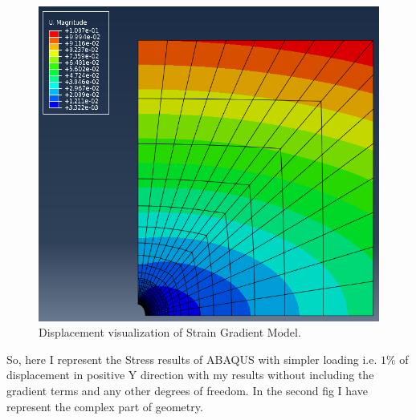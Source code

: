 \documentclass[12pt]{article}
\begin{document}
\begin{figure}[H]
	\begin{center}
		\includegraphics[scale=0.4]{MY_code_result_1.png} 
	\end{center}  
    \caption{Displacement visualization of Strain Gradient Model.}
\end{figure}
So, here I represent the Stress results of ABAQUS with simpler loading i.e. $ 1 \% $ of displacement in positive Y direction with my results without including the gradient terms and any other degrees of freedom. In the second fig I have represent the complex part of geometry.
\end{document}
